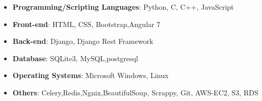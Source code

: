 
\begin{itemize}
\item \textbf{Programming/Scripting Languages}: Python, C, C++, JavaScript
\item \textbf{Front-end}: HTML, CSS, Bootstrap,Angular 7
\item \textbf{Back-end}: Django, Django Rest Framework
\item \textbf{Database}: SQLite3, MySQL,postgresql
\item \textbf{Operating Systems}: Microsoft Windows, Linux
\item \textbf{Others}: Celery,Redis,Ngnix,BeautifulSoup, Scrappy, Git, AWS-EC2, S3, RDS
\end{itemize}








